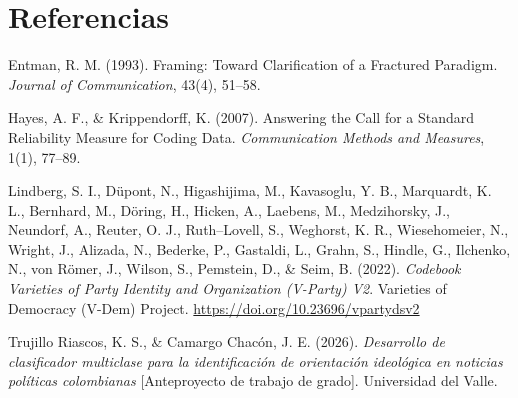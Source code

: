 \documentclass[11pt,letterpaper]{article}
\begin{document}
\newpage
\section*{Referencias}
\small
Entman, R. M. (1993). Framing: Toward Clarification of a Fractured Paradigm. \emph{Journal of
Communication}, 43(4), 51–58.

Hayes, A. F., \& Krippendorff, K. (2007). Answering the Call for a Standard Reliability Measure for Coding
Data. \emph{Communication Methods and Measures}, 1(1), 77–89.

Lindberg, S. I., Düpont, N., Higashijima, M., Kavasoglu, Y. B., Marquardt, K. L., Bernhard, M., Döring, H.,
Hicken, A., Laebens, M., Medzihorsky, J., Neundorf, A., Reuter, O. J., Ruth–Lovell, S., Weghorst, K. R.,
Wiesehomeier, N., Wright, J., Alizada, N., Bederke, P., Gastaldi, L., Grahn, S., Hindle, G., Ilchenko, N., von
Römer, J., Wilson, S., Pemstein, D., \& Seim, B. (2022). \emph{Codebook Varieties of Party Identity and
Organization (V-Party) V2}. Varieties of Democracy (V-Dem) Project.
\url{https://doi.org/10.23696/vpartydsv2}

Trujillo Riascos, K. S., \& Camargo Chacón, J. E. (2026). \emph{Desarrollo de clasificador multiclase para la
identificación de orientación ideológica en noticias políticas colombianas} [Anteproyecto de trabajo de
grado]. Universidad del Valle.
\end{document}
